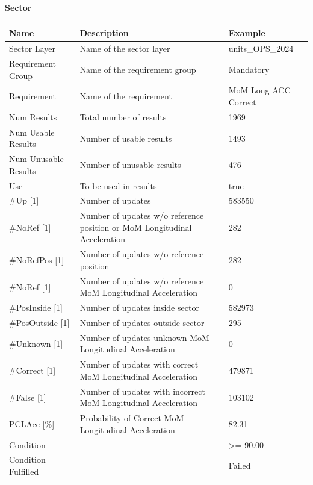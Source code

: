 \paragraph{Sector}

\begin{center}
 \begin{table}[H]
  \begin{tabularx}{\textwidth}{ | l | X |  l | }
    \hline
    \textbf{Name} & \textbf{Description} & \textbf{Example} \\ \hline
    Sector Layer & Name of the sector layer & units\_OPS\_2024 \\ \hline
    Requirement Group & Name of the requirement group & Mandatory \\ \hline
    Requirement & Name of the requirement & MoM Long ACC Correct \\ \hline
    Num Results & Total number of results & 1969 \\ \hline
    Num Usable Results & Number of usable results & 1493 \\ \hline
    Num Unusable Results & Number of unusable results & 476 \\ \hline
    Use & To be used in results & true \\ \hline
    \#Up [1] & Number of updates & 583550 \\ \hline
    \#NoRef [1] & Number of updates w/o reference position or MoM Longitudinal Acceleration & 282 \\ \hline
    \#NoRefPos [1] & Number of updates w/o reference position & 282 \\ \hline
    \#NoRef [1] & Number of updates w/o reference MoM Longitudinal Acceleration & 0 \\ \hline
    \#PosInside [1] & Number of updates inside sector & 582973 \\ \hline
    \#PosOutside [1] & Number of updates outside sector & 295 \\ \hline
    \#Unknown [1] & Number of updates unknown MoM Longitudinal Acceleration & 0 \\ \hline
    \#Correct [1] & Number of updates with correct MoM Longitudinal Acceleration & 479871 \\ \hline
    \#False [1] & Number of updates with incorrect MoM Longitudinal Acceleration & 103102 \\ \hline
    PCLAcc [\%] & Probability of Correct MoM Longitudinal Acceleration & 82.31 \\ \hline
    Condition &  & >= 90.00 \\ \hline
    Condition Fulfilled &  & Failed \\ \hline
    \end{tabularx}
\end{table}
\end{center}

